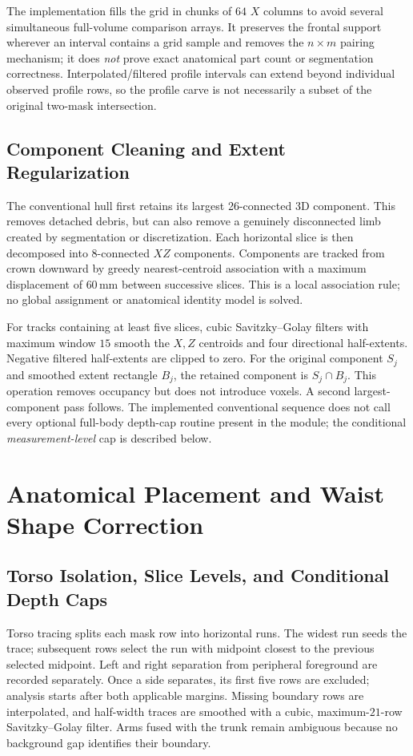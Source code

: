 \documentclass[11pt,a4paper]{article}
\numberwithin{equation}{section}
\begin{document}
The implementation fills the grid in chunks of $64$ $X$ columns to avoid several simultaneous full-volume comparison arrays. It preserves the frontal support wherever an interval contains a grid sample and removes the $n\times m$ pairing mechanism; it does \emph{not} prove exact anatomical part count or segmentation correctness. Interpolated/filtered profile intervals can extend beyond individual observed profile rows, so the profile carve is not necessarily a subset of the original two-mask intersection.

\subsection{Component Cleaning and Extent Regularization}
\label{subsec:extent_reg}
The conventional hull first retains its largest 26-connected 3D component. This removes detached debris, but can also remove a genuinely disconnected limb created by segmentation or discretization. Each horizontal slice is then decomposed into 8-connected $XZ$ components. Components are tracked from crown downward by greedy nearest-centroid association with a maximum displacement of $60$\,mm between successive slices. This is a local association rule; no global assignment or anatomical identity model is solved.

For tracks containing at least five slices, cubic Savitzky--Golay filters with maximum window $15$ smooth the $X,Z$ centroids and four directional half-extents. Negative filtered half-extents are clipped to zero. For the original component $S_j$ and smoothed extent rectangle $B_j$, the retained component is $S_j\cap B_j$. This operation removes occupancy but does not introduce voxels. A second largest-component pass follows. The implemented conventional sequence does not call every optional full-body depth-cap routine present in the module; the conditional \emph{measurement-level} cap is described below.

\section{Anatomical Placement and Waist Shape Correction}
\subsection{Torso Isolation, Slice Levels, and Conditional Depth Caps}
\label{subsec:anatomical_levels}
Torso tracing splits each mask row into horizontal runs. The widest run seeds the trace; subsequent rows select the run with midpoint closest to the previous selected midpoint. Left and right separation from peripheral foreground are recorded separately. Once a side separates, its first five rows are excluded; analysis starts after both applicable margins. Missing boundary rows are interpolated, and half-width traces are smoothed with a cubic, maximum-$21$-row Savitzky--Golay filter. Arms fused with the trunk remain ambiguous because no background gap identifies their boundary.
\end{document}
